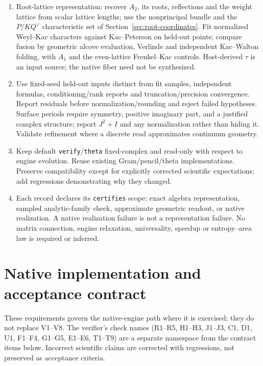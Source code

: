 \documentclass[11pt]{article}
\theoremstyle{definition}
\theoremstyle{remark}
\begin{document}
\begin{enumerate}[label=V\arabic*.,leftmargin=*]
geometry study (Section~\ref{sec:neck-entropy}) a separate representation
and entropy experiment with paired samples, period accuracy and
refinement, and logarithmic entropy asymptotics; it is neither a
requirement for the algebra theorem nor a claim about Ryu--Takayanagi.
\item Root-lattice representation: recover $A_2$, its roots, reflections
and the weight lattice from scalar lattice lengths; use the nonprincipal
bundle and the $P/KQ^\vee$ characteristic set of
Section~\ref{sec:root-coordinates}. Fit normalized Weyl--Kac characters
against Kac--Peterson on held-out points; compare fusion by geometric
alcove evaluation, Verlinde and independent Kac--Walton folding, with $A_1$
and the even-lattice Frenkel--Kac controls. Host-derived $\tau$ is an input
source; the native fiber need not be synthesized.
\item Use fixed-seed held-out inputs distinct from fit samples, independent
formulas, conditioning/rank reports and truncation/precision convergence.
Report residuals before normalization/rounding and reject failed
hypotheses. Surface periods require symmetry, positive imaginary part,
and a justified complex structure; report $J^2+I$ and any normalization
rather than hiding it. Validate refinement where a discrete read
approximates continuum geometry.
\item Keep default \texttt{verify}/\texttt{theta} fixed-complex and read-only
with respect to engine evolution. Reuse existing Gram/pencil/theta
implementations. Preserve compatibility except for explicitly corrected
scientific expectations; add regressions demonstrating why they changed.
\item Each record declares its \texttt{certifies} scope: exact algebra
representation, sampled analytic-family check, approximate geometric
readout, or native realization. A native realization failure is not a
representation failure. No matrix connection, engine relaxation,
universality, speedup or entropy--area law is required or inferred.
\end{enumerate}

\section{Native implementation and acceptance contract}\label{sec:implementation}

These requirements govern the native-engine path where it is exercised;
they do not replace V1--V8. The verifier's check names (R1--R5, H1--H3,
J1--J3, C1, D1, U1, F1--F4, G1--G5, E1--E6, T1--T9) are a separate
namespace from the contract items below. Incorrect scientific claims are
corrected with regressions, not preserved as acceptance criteria.
\end{document}

